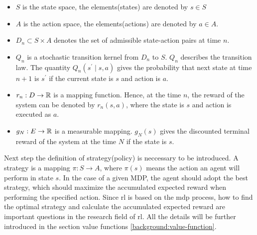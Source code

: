 \begin{itemize}
\item $S$ is the state space, the elements(states) are denoted by $s \in S$
\item $A$ is the action space, the elements(actions) are denoted by $a \in A$.
\item $D_{n} \subset S \times A$ denotes the set of admissible state-action pairs at time $n$.
\item $Q_n$ is a stochastic transition kernel from $D_n$ to $S$. $Q_n$ describes the transition law. The quantity $Q_n(s^{\prime} \mid s, a)$ gives the probability that next state at time $n+1$ is $s^{\prime}$ if the current state is $s$ and action is $a$.
\item $r_n: D \rightarrow \mathbb{R}$ is a mapping function. Hence, at the time $n$, the reward of the system can be denoted by $r_n(s, a)$, where the state is $s$ and action is executed as $a$.
\item $g_N: E \rightarrow \mathbb{R}$ is a measurable mapping. $g_N(s)$ gives the discounted terminal reward of the system at the time $N$ if the state is $s$. 
\end{itemize}

Next step the definition of strategy(policy) is neccessary to be introduced. A strategy is a mapping $\pi: S \rightarrow A$, where $\pi(s)$ means the action an agent will perform in state $s$. In the case of a given MDP, the agent should adopt the best strategy, which should maximize the accumulated expected reward when performing the specified action. Since \gls{rl} is based on the \gls{mdp} process, how to find the optimal strategy and calculate the accumulated expected reward are important questions in the research field of \gls{rl}. All the details will be further introduced in the section value functions \ref{background:value-function}.

